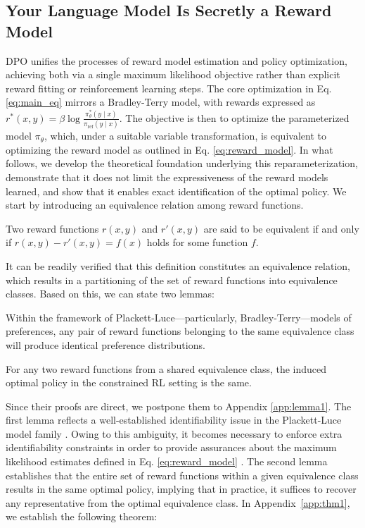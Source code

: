 \label{sec:theory}

\subsection{Your Language Model Is Secretly a Reward Model} DPO unifies the processes of reward model estimation and policy optimization, achieving both via a single maximum likelihood objective rather than explicit reward fitting or reinforcement learning steps. The core optimization in Eq. \ref{eq:main_eq} mirrors a Bradley-Terry model, with rewards expressed as $r^*(x, y) = \beta \log\frac{\pi^*_\theta(y \mid x)}{\pi_\text{ref}(y \mid x)}$. The objective is then to optimize the parameterized model $\pi_{\theta}$, which, under a suitable variable transformation, is equivalent to optimizing the reward model as outlined in Eq. \ref{eq:reward_model}. In what follows, we develop the theoretical foundation underlying this reparameterization, demonstrate that it does not limit the expressiveness of the reward models learned, and show that it enables exact identification of the optimal policy. We start by introducing an equivalence relation among reward functions.

\begin{definition}
Two reward functions $r(x, y)$ and $r'(x, y)$ are said to be equivalent if and only if ${r(x, y)-r'(x, y) = f(x)}$ holds for some function $f$.
\end{definition}

It can be readily verified that this definition constitutes an equivalence relation, which results in a partitioning of the set of reward functions into equivalence classes. Based on this, we can state two lemmas:

\begin{lemma}\label{lemma:same_prefrence} Within the framework of Plackett-Luce—particularly, Bradley-Terry—models of preferences, any pair of reward functions belonging to the same equivalence class will produce identical preference distributions.
\end{lemma}

\begin{lemma}\label{lemma:same_policy}
    For any two reward functions from a shared equivalence class, the induced optimal policy in the constrained RL setting is the same.
\end{lemma}

Since their proofs are direct, we postpone them to Appendix \ref{app:lemma1}. The first lemma reflects a well-established identifiability issue in the Plackett-Luce model family \cite{plackett1975analysis}. Owing to this ambiguity, it becomes necessary to enforce extra identifiability constraints in order to provide assurances about the maximum likelihood estimates defined in Eq. \ref{eq:reward_model} \cite{bong2022generalized}. The second lemma establishes that the entire set of reward functions within a given equivalence class results in the same optimal policy, implying that in practice, it suffices to recover any representative from the optimal equivalence class. In Appendix~\ref{app:thm1}, we establish the following theorem:

